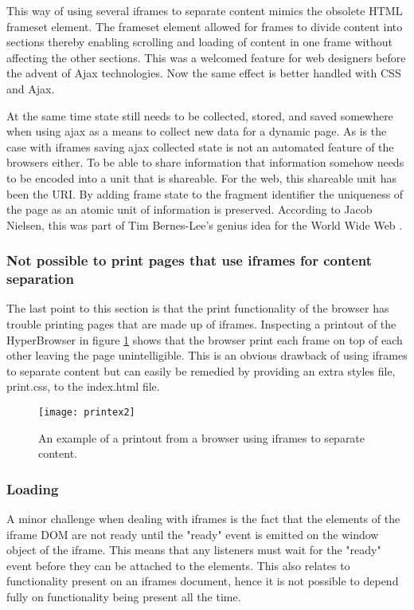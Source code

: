 \documentclass[english]{ifimaster}
\begin{document}
This way of using several iframes to separate content mimics the obsolete HTML frameset element. The frameset element allowed for frames to divide content into sections thereby enabling scrolling and loading of content in one frame without affecting the other sections. This was a welcomed feature for web designers before the advent of Ajax technologies. Now the same effect is better handled with CSS and Ajax. 

At the same time state still needs to be collected, stored, and saved somewhere when using ajax as a means to collect new data for a dynamic page. As is the case with iframes saving ajax collected state is not an automated feature of the browsers either. To be able to share information that information somehow needs to be encoded into a unit that is shareable. For the web, this shareable unit has been the URI. By adding frame state to the fragment identifier the uniqueness of the page as an atomic unit of information is preserved. According to Jacob Nielsen, this was part of Tim Bernes-Lee's genius idea for the World Wide Web \parencite{nielsenFrames}. 

\subsubsection{Not possible to print pages that use iframes for content separation}
The last point to this section is that the print functionality of the browser has trouble printing pages that are made up of iframes. Inspecting a printout of the HyperBrowser in figure \ref{fig:printEx} shows that the browser print each frame on top of each other leaving the page unintelligible. This is an obvious drawback of using iframes to separate content but can easily be remedied by providing an extra styles file, print.css, to the index.html file. 

\begin{figure}
\centering
\texttt{[image: printex2]}
\caption{An example of a printout from a browser using iframes to separate content.}
\label{fig:printEx}
\end{figure}

\subsubsection{Loading}
A minor challenge when dealing with iframes is the fact that the elements of the iframe DOM are not ready until the "ready" event is emitted on the window object of the iframe. This means that any listeners must wait for the "ready" event before they can be attached to the elements. This also relates to functionality present on an iframes document, hence it is not possible to depend fully on functionality being present all the time.
\end{document}
